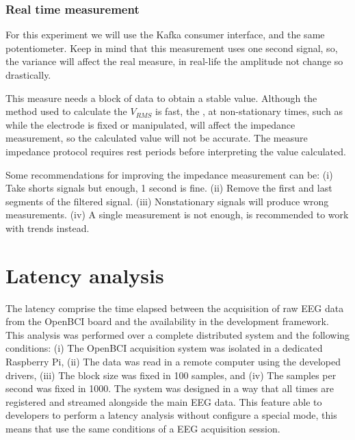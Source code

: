\subsubsection{Real time measurement}
For this experiment we will use the Kafka consumer interface, and the same potentiometer. Keep in mind that this measurement uses one second signal, so, the variance will affect the real measure, in real-life the amplitude not change so drastically.




This measure needs a block of data to obtain a stable value. Although the method used to calculate the $V_{RMS}$ is fast, the , at non-stationary times, such as while the electrode is fixed or manipulated, will affect the impedance measurement, so the calculated value will not be accurate. The measure impedance protocol requires rest periods before interpreting the value calculated.

Some recommendations for improving the impedance measurement can be:
(i) Take shorts signals but enough, 1 second is fine. 
(ii) Remove the first and last segments of the filtered signal.
(iii) Nonstationary signals will produce wrong measurements.
(iv) A single measurement is not enough, is recommended to work with trends instead.

\section{Latency analysis} 

The latency comprise the time elapsed between the acquisition of raw EEG data from the OpenBCI board and the availability in the development framework. This analysis was performed over a complete distributed system and the following conditions: (i) The OpenBCI acquisition system was isolated in a dedicated Raspberry Pi, (ii) The data was read in a remote computer using the developed drivers, (iii) The block size was fixed in 100 samples, and (iv) The samples per second was fixed in 1000. The system was designed in a way that all times are registered and streamed alongside the main EEG data. This feature able to developers to perform a latency analysis without configure a special mode, this means that use the same conditions of a EEG acquisition session. 

